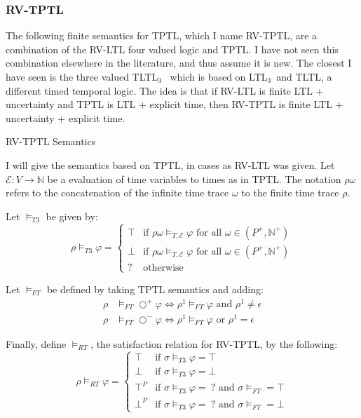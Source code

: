 \documentclass[a4paper]{article}
\newcommand{\tand}{\text{ and }}
\newcommand{\tor}{\text{ or }}
\newcommand{\fall}{\text{ for all }}
\newcommand{\sn}{\bigcirc^+}
\newcommand{\wn}{\bigcirc^-}
\newcommand{\eval}{\mathcal{E}}
\newcommand{\ltlt}{LTL$_3$}
\begin{document}
\subsubsection{RV-TPTL} The following finite semantics for TPTL, which I name RV-TPTL, are a combination of the RV-LTL four valued logic and TPTL. I have not seen this combination elsewhere in the literature, and thus assume it is new. The closest I have seen is the three valued TLTL$_3$~\autocite[6]{arafat2005runtime} which is based on \ltlt\ and TLTL, a different timed temporal logic. The idea is that if RV-LTL is finite LTL + uncertainty and TPTL is LTL + explicit time, then RV-TPTL is finite LTL + uncertainty + explicit time.
\begin{defn}{RV-TPTL Semantics}

  I will give the semantics based on TPTL, in cases as RV-LTL was given. Let $\eval:V\to\mathbb{N}$ be a evaluation of time variables to times as in TPTL.
  The notation $\rho\omega$ refers to the concatenation of the infinite time trace $\omega$ to the finite time trace $\rho$. 

  Let $\vDash_{T3}$ be given by:
  \[\rho\vDash_{T3}\varphi = \begin{cases}
      \top & \text{if } \rho\omega \vDash_{T,\eval} \varphi \fall \omega \in (P^+,\mathbb{N}^+)\\
      \bot & \text{if }  \rho\omega \vDash_{T,\eval} \varphi \fall \omega \in (P^+,\mathbb{N}^+)\\
      ? & \text{otherwise}
    \end{cases}
  \]

  Let $\vDash_{FT}$ be defined by taking TPTL semantics and adding:
  \begin{align*}
    \rho&\vDash_{FT}\sn\varphi \iff \rho^1\vDash_{FT}\varphi \tand \rho^1 \neq \epsilon\\
    \rho&\vDash_{FT}\wn\varphi \iff \rho^1\vDash_{FT}\varphi \tor \rho^1 = \epsilon
  \end{align*}

  Finally, define $\vDash_{RT}$, the satisfaction relation for RV-TPTL, by the following:
  \[\rho\vDash_{RT}\varphi =
    \begin{cases}
      \top & \text{if } \sigma \vDash_{T3} \varphi = \top\\
      \bot & \text{if } \sigma \vDash_{T3} \varphi = \bot\\
      \top^P & \text{if } \sigma \vDash_{T3} \varphi = ~?\tand \sigma\vDash_{FT} = \top \\
      \bot^P & \text{if } \sigma \vDash_{T3} \varphi = ~?\tand \sigma\vDash_{FT} = \bot
    \end{cases}
  \]
\end{defn}
\end{document}
